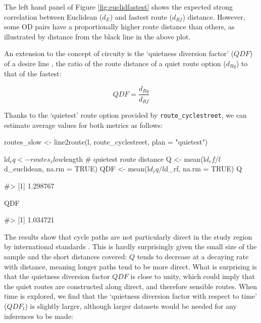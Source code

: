 The left hand panel of Figure \ref{fig:euclidfastest} shows the expected
strong correlation between Euclidean (\(d_E\)) and fastest route
(\(d_{Rf}\)) distance. However, some OD pairs have a proportionally
higher route distance than others, as illustrated by distance from the
black line in the above plot.

An extension to the concept of circuity is the `quietness diversion
factor' (\(QDF\)) of a desire line \citep{lovelace_propensity_2017}, the
ratio of the route distance of a quiet route option (\(d_{Rq}\)) to that
of the fastest:

\[
 QDF = \frac{d_{Rq}}{d_{Rf}}
\]

Thanks to the `quietest' route option provided by
\texttt{route\_cyclestreet}, we can estimate average values for both
metrics as follows:

\begin{Schunk}
\begin{Sinput}
routes_slow <- line2route(l, route_cyclestreet, plan = "quietest")
\end{Sinput}
\end{Schunk}

\begin{Schunk}
\begin{Sinput}
l$d_rq <- routes_slow$length # quietest route distance
Q <- mean(l$d_rf / l$d_euclidean, na.rm = TRUE)
QDF <- mean(l$d_rq / l$d_rf, na.rm = TRUE)
Q
\end{Sinput}
\begin{Soutput}
#> [1] 1.298767
\end{Soutput}
\begin{Sinput}
QDF
\end{Sinput}
\begin{Soutput}
#> [1] 1.034721
\end{Soutput}
\end{Schunk}

The results show that cycle paths are not particularly direct in the
study region by international standards \citep{crow_design_2007}. This
is hardly surprisingly given the small size of the sample and the short
distances covered: \(Q\) tends to decrease at a decaying rate with
distance, meaning longer paths tend to be more direct.
What is surprising is that the quietness diversion factor
\(QDF\) is close to unity, which
could imply that the quiet routes are constructed along direct, and
therefore sensible routes.
When time is
explored, we find that the `quietness diversion factor with respect to
time' (\(QDF_t\)) is slightly larger,
although larger datasets would be needed for any inferences to be made:

